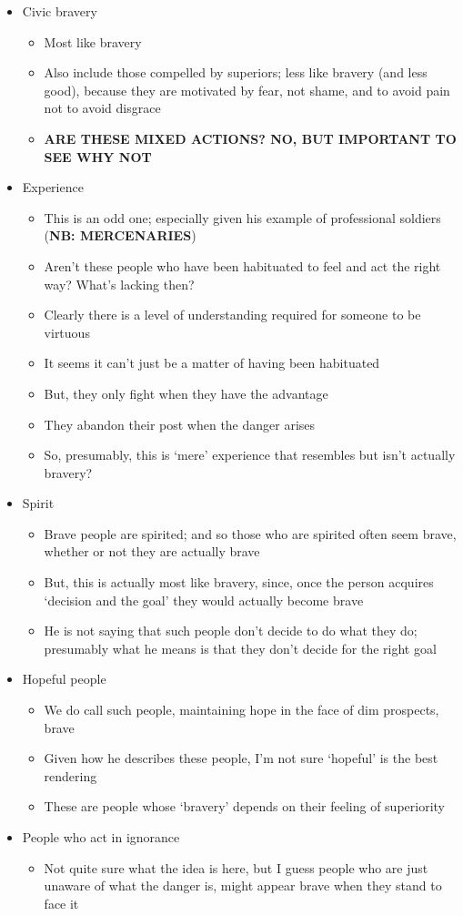 \documentclass[11pt]{article}
\begin{document}
\begin{itemize}\item{Civic bravery}\begin{itemize}\item{Most like bravery}\item{Also include those compelled by superiors; less like bravery (and less good), because they are motivated by fear, not shame, and to avoid pain not to avoid disgrace}\item{\textbf{ARE THESE MIXED ACTIONS? NO, BUT IMPORTANT TO SEE WHY NOT}}\end{itemize}\item{Experience}\begin{itemize}\item{This is an odd one; especially given his example of professional soldiers (\textbf{NB: MERCENARIES})}\item{Aren't these people who have been habituated to feel and act the right way? What's lacking then?}\item{Clearly there is a level of understanding required for someone to be virtuous}\item{It seems it can't just be a matter of having been habituated}\item{But, they only fight when they have the advantage}\item{They abandon their post when the danger arises}\item{So, presumably, this is `mere' experience that resembles but isn't actually bravery?}\end{itemize}\item{Spirit}\begin{itemize}\item{Brave people are spirited; and so those who are spirited often seem brave, whether or not they are actually brave}\item{But, this is actually most like bravery, since, once the person acquires `decision and the goal' they would actually become brave}\item{He is not saying that such people don't decide to do what they do; presumably what he means is that they don't decide for the right goal}\end{itemize}\item{Hopeful people}\begin{itemize}\item{We do call such people, maintaining hope in the face of dim prospects, brave}\item{Given how he describes these people, I'm not sure `hopeful' is the best rendering}\item{These are people whose `bravery' depends on their feeling of superiority}\end{itemize}\item{People who act in ignorance}\begin{itemize}\item{Not quite sure what the idea is here, but I guess people who are just unaware of what the danger is, might appear brave when they stand to face it}\end{itemize}\end{itemize}
\end{document}

